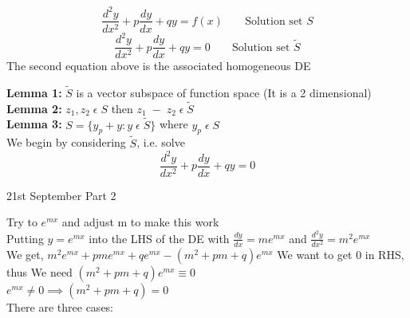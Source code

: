 \documentclass[11pt]{article}
\theoremstyle{definition}
\begin{document}
$$\frac{d^2y}{dx^2} + p\frac{dy}{dx} + qy = f(x) \;\;\;\;\;\;\; \text{Solution set } S$$
$$\frac{d^2y}{dx^2} + p\frac{dy}{dx} + qy = 0 \;\;\;\;\;\;\; \text{Solution set } \tilde{S}$$
The second equation above is the associated homogeneous DE

\textbf{Lemma 1:} $\tilde{S}$ is a vector subspace of function space (It is a 2 dimensional)\\
\textbf{Lemma 2:} $z_1, z_2 \; \epsilon\; S$  then $z_1\; -\; z_2\; \epsilon\; \tilde{S} $\\
\textbf{Lemma 3:} $S = \{y_p + y: y\; \epsilon\; \tilde{S}\}$ where $y_p\; \epsilon\; S$\\

We begin by considering $\tilde{S}$, i.e. solve
$$\frac{d^2y}{dx^2} + p\frac{dy}{dx} + qy = 0$$

\newpage
\begin{center}
    {\LARGE 21st September Part 2}\\
\end{center}
Try to  $e^{mx}$ and adjust m to make this work\\
Putting $y = e^{mx}$ into the LHS of the DE with
$\frac{dy}{dx} = me^{mx}$ and $\frac{d^2y}{dx^2} = m^2e^{mx}$\\
We get, $m^2e^{mx} + pme^{mx} + qe^{mx} - (m^2 + pm + q)e^{mx}$
We want to get $0$ in RHS, thus
We need $(m^2 + pm + q)e^{mx} \equiv 0$\\
$e^{mx} \neq 0 \implies (m^2 + pm + q) = 0$\\
There are three cases:
\end{document}
